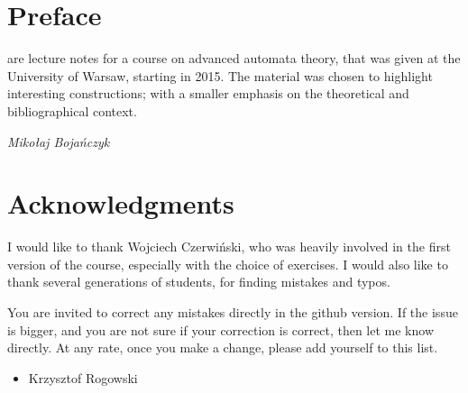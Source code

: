 \documentclass[b5paper,11pt]{book}
\begin{document}
\chapter*{Preface}%
{  \raggedright
{} are lecture notes for a course on advanced automata theory, that was given at the University of Warsaw, starting in 2015.  
The material was chosen to highlight interesting constructions; with a smaller emphasis on  the theoretical and bibliographical context.  




\bigskip
{\slshape  \noindent Miko{\l}aj Boja\'nczyk}


\cleardoublepage

%      
\chapter*{Acknowledgments}%
{  \raggedright
I would like to thank Wojciech Czerwi\'nski, who was heavily involved in the first version of the course, especially with the choice of exercises. I would also like to thank several generations of students, for finding mistakes and typos.

You are invited to correct any mistakes directly in the github version. If the issue is bigger, and you are not sure if your correction is correct, then let me know directly. At any rate, once you make a change, please add yourself to this list. 

\begin{itemize}
    \item Krzysztof Rogowski
\end{itemize}




\cleardoublepage


%      
\tableofcontents
\thispagestyle{empty}

\mainmatter   %
\pagestyle{fancy}

\newcommand{\rozdzial}[2]{ 
\chapter{#1}
\seclabel{sec:#2}
\secintro{}

}

\newcommand{\bookcontent}{


}}}
\end{document}

